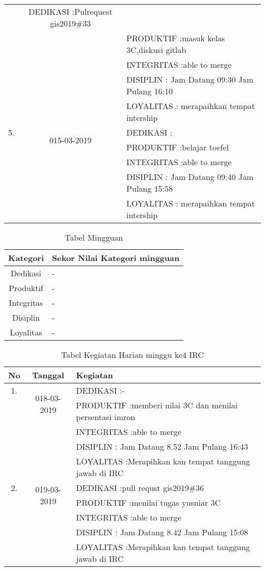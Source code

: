 \begin{table}[h]
\begin{tabular}{|c|c|l|}
&DEDIKASI :Pulrequest gis2019\#33 \\
&&PRODUKTIF :masuk kelas 3C,diskusi gitlab\\
&&INTEGRITAS :able to merge\\
&&DISIPLIN : Jam Datang 09:30 Jam Pulang 16:10\\
&&LOYALITAS : merapaihkan tempat intership\\
\hline
5.&\multirow{2}{*}{015-03-2019}
&DEDIKASI : \\
&&PRODUKTIF :belajar toefel\\
&&INTEGRITAS :able to merge\\
&&DISIPLIN : Jam Datang 09:40 Jam Pulang 15:58\\
&&LOYALITAS : merapaihkan tempat intership\\
\hline
\end{tabular}
\label{table:contoh}
\end{table}

\begin{table}[h]
\begin{center}
\caption{Tabel Mingguan}
\begin{tabular}{|c|l|}
\hline
Kategori& Sekor Nilai Kategori mingguan\\
\hline
Dedikasi & -\\
\hline
Produktif & -\\
\hline
Integritas & -\\
\hline
Disiplin & -\\
\hline
Loyalitas & -\\
\hline
\end{tabular}
\end{center}
\label {Tabel:contoh} 
\end{table}

\begin{table}[h]
\caption{Tabel Kegiatan Harian minggu ke4 IRC}
\centering
\begin{tabular}{|c|c|l|}
\hline
No&Tanggal&Kegiatan\\
\hline
1.&\multirow{2}{*}{018-03-2019}
&DEDIKASI :- \\
&&PRODUKTIF :memberi nilai 3C dan menilai persentasi imron\\
&&INTEGRITAS :able to merge\\
&&DISIPLIN : Jam Datang 8.52 Jam Pulang 16:43\\
&&LOYALITAS :Merapihkan kan tempat tanggung jawab di IRC\\
\hline
2.&\multirow{2}{*}{019-03-2019}
&DEDIKASI :pull requst gis2019\#36\\
&&PRODUKTIF :menilai tugas yusniar 3C\\
&&INTEGRITAS :able to merge\\
&&DISIPLIN : Jam Datang 8.42 Jam Pulang 15:08\\
&&LOYALITAS :Merapihkan kan tempat tanggung jawab di IRC\\
\hline
\end{tabular}
\label{table:contoh}
\end{table}